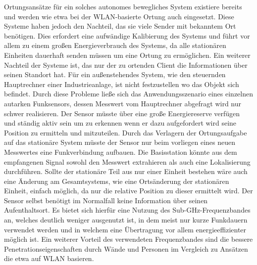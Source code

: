 Ortungsansätze für ein solches autonomes bewegliches System existiere bereits und werden wie etwa bei der WLAN-basierte Ortung auch eingesetzt. Diese Systeme haben jedoch den Nachteil, das sie viele Sender mit bekanntem Ort benötigen. Dies erfordert eine aufwändige Kalibierung des Systems und führt vor allem zu einem großen Energieverbrauch des Systems, da alle stationären Einheiten dauerhaft senden müssen um eine Ortung zu ermöglichen.
Ein weiterer Nachteil der Systeme ist, das nur der zu ortenden Client die Informationen über seinen Standort hat. Für ein außenstehendes System, wie den steuernden Hauptrechner einer Industrieanlage, ist nicht festzustellen wo das Objekt sich befindet. %
Durch diese Probleme ließe sich das Anwendungsszenario eines einzelnen autarken Funksensors, dessen Messwert vom Hauptrechner abgefragt wird nur schwer realisieren. Der Sensor müsste über eine große Energiereserve verfügen und ständig aktiv sein um zu erkennen wenn er dazu aufgefordert wird seine Position zu ermitteln und mitzuteilen.
Durch das Verlagern der Ortungsaufgabe auf das stationäre System müsste der Sensor nur beim vorliegen eines neuen Messwertes eine Funkverbindung aufbauen. Die Basisstation könnte aus dem empfangenen Signal sowohl den Messwert extrahieren als auch eine Lokalisierung durchführen.
Sollte der stationäre Teil  aus nur einer Einheit bestehen wäre auch eine Änderung am Gesamtsystems, wie eine Ortsänderung der stationären Einheit, einfach möglich, da nur die relative Position zu dieser ermittelt wird. Der Sensor selbst benötigt im Normalfall keine Information über seinen Aufenthaltsort. 
Es bietet sich hierfür eine Nutzung des Sub-GHz-Frequenzbandes an, welches deutlich weniger ausgenutzt ist, in dem meist nur kurze Funkdauern verwendet werden und in welchem eine Übertragung vor allem energieeffizienter möglich ist\cite{SabolcikGHzoderSub}.
Ein weiterer Vorteil des verwendeten Frequenzbandes sind die bessere Penetrationseigenschaften durch Wände und Personen im Vergleich zu Ansätzen die etwa auf WLAN basieren.
